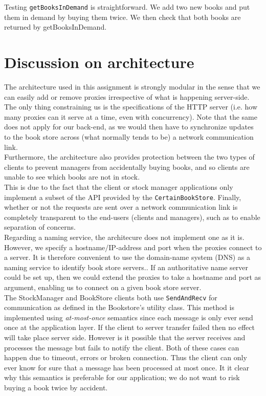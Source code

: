 \documentclass[11pt]{article}
\begin{document}
Testing \texttt{getBooksInDemand} is straightforward. We add two new books and put them in demand by buying them twice. We then check that both books are returned by getBooksInDemand.

\section*{Discussion on architecture}

The architecture used in this assignment is strongly modular in the sense that
we can easily add or remove proxies irrespective of what is happening
server-side. The only thing constraining us is the specifications of the HTTP
server (i.e. how many proxies can it serve at a time, even with
concurrency). Note that the same does not apply for our back-end, as we would
then have to synchronize updates to the book store across (what normally
tends to be) a network communication link.\\

Furthermore, the architecture also provides protection between the two types of
clients to prevent managers from accidentally buying books, and so clients are
unable to see which books are not in stock.\\

This is due to the fact that the client or stock manager applications only 
implement a subset of the API provided by the \texttt{CertainBookStore}.
Finally, whether or not the requests are sent over a network communication link
is completely transparent to the end-users (clients and managers), such as to
enable separation of concerns.\\

Regarding a naming service, the architecure does not implement one as it is.
However, we specify a hostname/IP-address and port when the proxies connect
to a server. It is therefore convenient to use the domain-name system
(DNS) as a naming service to identify book store servers.. If an authoritative
name server could be set up, then we could extend the proxies to take a
hostname and port as argument, enabling us to connect on a given book store
server.\\


The StockManager and BookStore clients both use \texttt{SendAndRecv} for communication as defined in the Bookstore’s utility class. This method is implemented using \emph{at-most-once} semantics since each message is only ever send once at the application layer. If the client to server transfer failed then no effect will take place server side. However is it possible that the server receives and processes the message but fails to notify the client. Both of these cases can happen due to timeout, errors or broken connection. Thus the client can only ever know for sure that a message has been processed at most once. It it
clear why this semantics is preferable for our application; we do not want to risk buying
a book twice by accident.
\end{document}
